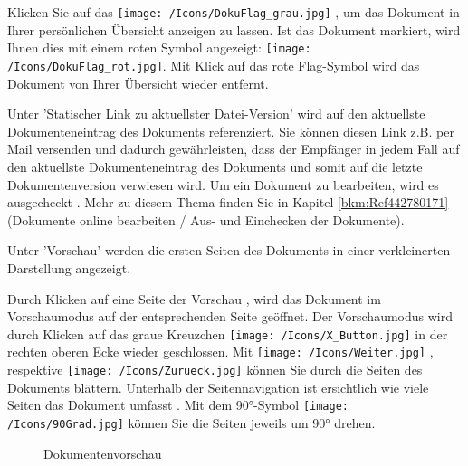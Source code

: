 Klicken Sie auf das \texttt{[image: /Icons/DokuFlag\_grau.jpg]} , um das Dokument in Ihrer persönlichen Übersicht anzeigen zu lassen. Ist das Dokument markiert, wird Ihnen dies mit einem roten Symbol angezeigt: \texttt{[image: /Icons/DokuFlag\_rot.jpg]}. Mit Klick auf das rote Flag-Symbol wird das Dokument von Ihrer Übersicht wieder entfernt. \newline

Unter 'Statischer Link zu aktuellster Datei-Version'  wird auf den aktuellste Dokumenteneintrag des Dokuments referenziert. Sie können diesen Link z.B. per Mail versenden und dadurch gewährleisten, dass der Empfänger in jedem Fall auf den aktuellste Dokumenteneintrag des Dokuments und somit auf die letzte Dokumentenversion verwiesen wird. Um ein Dokument zu bearbeiten, wird es ausgecheckt . Mehr zu diesem Thema finden Sie in Kapitel \ref{bkm:Ref442780171} (Dokumente online bearbeiten / Aus- und Einchecken der Dokumente).

\vspace{\baselineskip}

Unter 'Vorschau'  werden die ersten Seiten des Dokuments in einer verkleinerten Darstellung angezeigt.

\vspace{\baselineskip}

Durch Klicken auf eine Seite der Vorschau , wird das Dokument im Vorschaumodus auf der entsprechenden Seite geöffnet. Der Vorschaumodus wird durch Klicken auf das graue Kreuzchen \texttt{[image: /Icons/X\_Button.jpg]}  in der rechten oberen Ecke wieder geschlossen. Mit \texttt{[image: /Icons/Weiter.jpg]} , respektive \texttt{[image: /Icons/Zurueck.jpg]}  können Sie durch die Seiten des Dokuments blättern. Unterhalb der Seitennavigation ist ersichtlich wie viele Seiten das Dokument umfasst . Mit dem 90°-Symbol \texttt{[image: /Icons/90Grad.jpg]}  können Sie die Seiten jeweils um 90° drehen.

\begin{figure}[H]
\caption{Dokumentenvorschau}
\end{figure}

